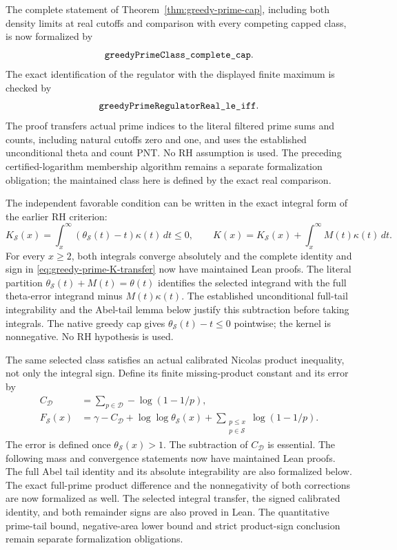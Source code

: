 \documentclass[11pt]{article}
\theoremstyle{definition}
\begin{document}
The complete statement of Theorem~\ref{thm:greedy-prime-cap},
including both density limits at real cutoffs and comparison
with every competing capped class, is now formalized by
\[
 \texttt{greedyPrimeClass\_\allowbreak complete\_\allowbreak cap}.
\]
The exact identification of the regulator with the displayed
finite maximum is checked by
\[
 \texttt{greedyPrimeRegulatorReal\_\allowbreak le\_\allowbreak iff}.
\]
The proof transfers actual prime indices to the literal filtered
prime sums and counts, including natural cutoffs zero and one,
and uses the established unconditional theta and count PNT.
No RH assumption is used.
The preceding certified-logarithm membership algorithm remains
a separate formalization obligation; the maintained class here
is defined by the exact real comparison.

The independent favorable condition can be written in the exact
integral form of the earlier RH criterion:
\begin{equation}
 K_{\mathcal S}(x)=
    \int_x^\infty(\theta_{\mathcal S}(t)-t)\kappa(t)\,dt\le0,
 \qquad
 K(x)=K_{\mathcal S}(x)+\int_x^\infty M(t)\kappa(t)\,dt.
 \label{eq:greedy-prime-K-transfer}
\end{equation}
For every $x\ge2$, both integrals converge absolutely and the complete
identity and sign in \eqref{eq:greedy-prime-K-transfer} now have maintained
Lean proofs. The literal partition
$\theta_{\mathcal S}(t)+M(t)=\theta(t)$ identifies the selected integrand
with the full theta-error integrand minus $M(t)\kappa(t)$.
The established unconditional full-tail integrability and the Abel-tail
lemma below justify this subtraction before taking integrals.
The native greedy cap gives $\theta_{\mathcal S}(t)-t\le0$ pointwise;
the kernel is nonnegative. No RH hypothesis is used.


The same selected class satisfies an actual calibrated
Nicolas product inequality, not only the integral sign.
Define its finite missing-product constant and its error by
\begin{equation}
 \begin{aligned}
 C_{\mathcal D}
   &=\sum_{p\in\mathcal D}-\log(1-1/p),\\
 F_{\mathcal S}(x)
   &=\gamma-C_{\mathcal D}+\log\log\theta_{\mathcal S}(x)
       +\sum_{\substack{p\le x\\p\in\mathcal S}}\log(1-1/p).
 \end{aligned}
 \label{eq:greedy-prime-calibrated-Nicolas}
\end{equation}
The error is defined once $\theta_{\mathcal S}(x)>1$.
The subtraction of $C_{\mathcal D}$ is essential.
The following mass and convergence statements now have maintained Lean
proofs. The full Abel tail identity and its absolute integrability are
also formalized below. The exact full-prime product difference and the
nonnegativity of both corrections are now formalized as well. The
selected integral transfer, the signed calibrated identity, and both
remainder signs are also proved in Lean. The quantitative prime-tail
bound, negative-area lower bound and strict product-sign conclusion
remain separate formalization obligations.
\end{document}
